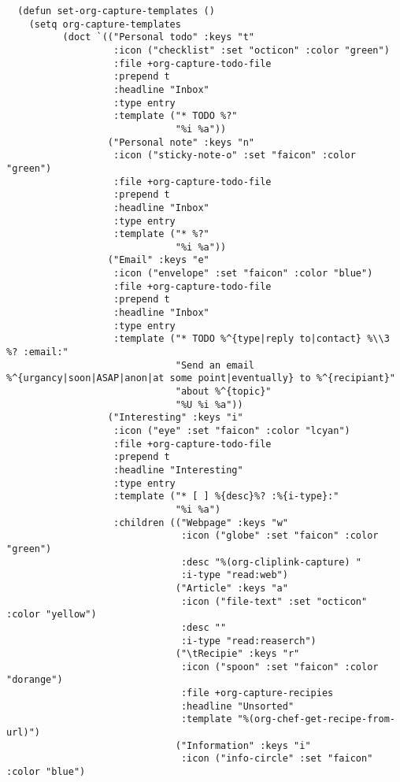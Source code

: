 \documentclass[c]{article}
\theoremstyle{plain}%
\theoremstyle{definition}
\theoremstyle{remark}
\begin{document}
\begin{verbatim}
  (defun set-org-capture-templates ()
    (setq org-capture-templates
          (doct `(("Personal todo" :keys "t"
                   :icon ("checklist" :set "octicon" :color "green")
                   :file +org-capture-todo-file
                   :prepend t
                   :headline "Inbox"
                   :type entry
                   :template ("* TODO %?"
                              "%i %a"))
                  ("Personal note" :keys "n"
                   :icon ("sticky-note-o" :set "faicon" :color "green")
                   :file +org-capture-todo-file
                   :prepend t
                   :headline "Inbox"
                   :type entry
                   :template ("* %?"
                              "%i %a"))
                  ("Email" :keys "e"
                   :icon ("envelope" :set "faicon" :color "blue")
                   :file +org-capture-todo-file
                   :prepend t
                   :headline "Inbox"
                   :type entry
                   :template ("* TODO %^{type|reply to|contact} %\\3 %? :email:"
                              "Send an email %^{urgancy|soon|ASAP|anon|at some point|eventually} to %^{recipiant}"
                              "about %^{topic}"
                              "%U %i %a"))
                  ("Interesting" :keys "i"
                   :icon ("eye" :set "faicon" :color "lcyan")
                   :file +org-capture-todo-file
                   :prepend t
                   :headline "Interesting"
                   :type entry
                   :template ("* [ ] %{desc}%? :%{i-type}:"
                              "%i %a")
                   :children (("Webpage" :keys "w"
                               :icon ("globe" :set "faicon" :color "green")
                               :desc "%(org-cliplink-capture) "
                               :i-type "read:web")
                              ("Article" :keys "a"
                               :icon ("file-text" :set "octicon" :color "yellow")
                               :desc ""
                               :i-type "read:reaserch")
                              ("\tRecipie" :keys "r"
                               :icon ("spoon" :set "faicon" :color "dorange")
                               :file +org-capture-recipies
                               :headline "Unsorted"
                               :template "%(org-chef-get-recipe-from-url)")
                              ("Information" :keys "i"
                               :icon ("info-circle" :set "faicon" :color "blue")

\end{verbatim}
\end{document}

